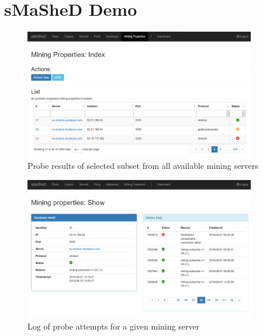 \documentclass[preprint,12pt,3p]{elsarticle}
\begin{document}
\pagebreak
\section{sMaSheD Demo}
\label{appendix-sec3}

\begin{figure}[!h]
    \centering
    \includegraphics[width=0.9\textwidth]{smashed1.png}
    \caption{Probe results of selected subset from all available mining servers}
    \label{fig:smashed1}
\end{figure}

\begin{figure}[!h]
    \centering
    \includegraphics[width=0.9\textwidth]{smashed2.png}
    \caption{Log of probe attempts for a given mining server}
    \label{fig:smashed2}
\end{figure}
\end{document}
